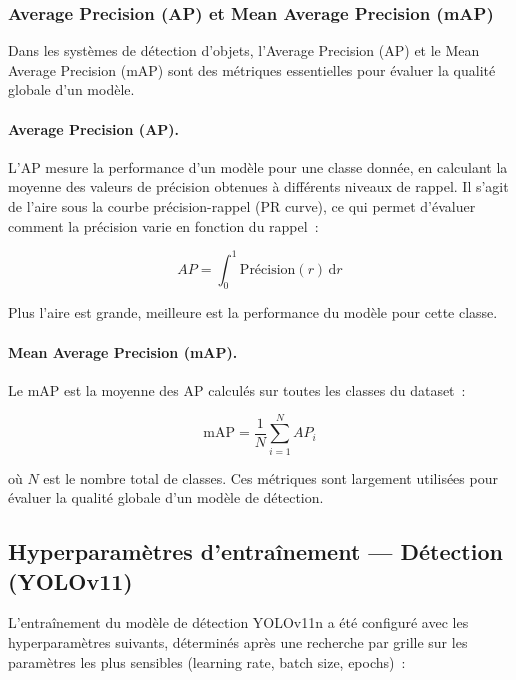 \subsubsection*{Average Precision (AP) et Mean Average Precision (mAP)}

Dans les systèmes de détection d'objets, l'Average Precision (AP) et le Mean Average
Precision (mAP) sont des métriques essentielles pour évaluer la qualité globale d'un modèle.

\paragraph{Average Precision (AP).}
L'AP mesure la performance d'un modèle pour une classe donnée, en calculant la
moyenne des valeurs de précision obtenues à différents niveaux de rappel.
Il s'agit de l'aire sous la courbe précision-rappel (PR curve), ce qui permet
d'évaluer comment la précision varie en fonction du rappel~:

\begin{equation}
AP = \int_0^1 \text{Précision}(r)\, \mathrm{d}r
\label{eq:ap}
\end{equation}

Plus l'aire est grande, meilleure est la performance du modèle pour cette classe.

\paragraph{Mean Average Precision (mAP).}
Le mAP est la moyenne des AP calculés sur toutes les classes du dataset~:

\begin{equation}
\text{mAP} = \frac{1}{N} \sum_{i=1}^{N} AP_i
\label{eq:map}
\end{equation}

où $N$ est le nombre total de classes. Ces métriques sont largement utilisées pour
évaluer la qualité globale d'un modèle de détection.

\subsection{Hyperparamètres d'entraînement --- Détection (YOLOv11)}

L'entraînement du modèle de détection YOLOv11n a été configuré avec les
hyperparamètres suivants, déterminés après une recherche par grille sur les
paramètres les plus sensibles (learning rate, batch size, epochs)~:

